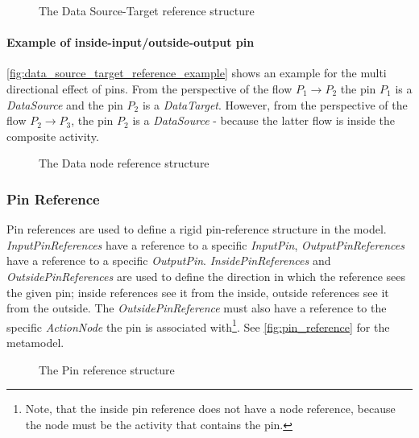 \begin{figure}[!ht]
	\centering
	
	\caption{The Data Source-Target reference structure}
	\label{fig:data_source_target_reference}
\end{figure}

\paragraph{Example of inside-input/outside-output pin} \autoref{fig:data_source_target_reference_example} shows an example for the multi directional effect of pins. From the perspective of the flow \(P_1 \rightarrow P_2\) the pin \(P_1\) is a \emph{DataSource} and the pin \(P_2\) is a \emph{DataTarget}. However, from the perspective of the flow \(P_2 \rightarrow P_3\), the pin \(P_2\) is a \emph{DataSource} - because the latter flow is inside the composite activity.

\begin{figure}[!ht]
	\centering
	
	\caption{The Data node reference structure}
	\label{fig:data_source_target_reference_example}
\end{figure}

\subsubsection*{Pin Reference}\label{ssec:pin-reference}

Pin references are used to define a rigid pin-reference structure in the model. \emph{InputPinReferences} have a reference to a specific \emph{InputPin}, \emph{OutputPinReferences} have a reference to a specific \emph{OutputPin}. \emph{InsidePinReferences} and \emph{OutsidePinReferences} are used to define the direction in which the reference sees the given pin; inside references see it from the inside, outside references see it from the outside. The \emph{OutsidePinReference} must also have a reference to the specific \emph{ActionNode} the pin is associated with\footnote{Note, that the inside pin reference does not have a node reference, because the node must be the activity that contains the pin.}. See \autoref{fig:pin_reference} for the metamodel.

\begin{figure}[!ht]
	\centering
	
	\caption{The Pin reference structure}
	\label{fig:pin_reference}
\end{figure}

